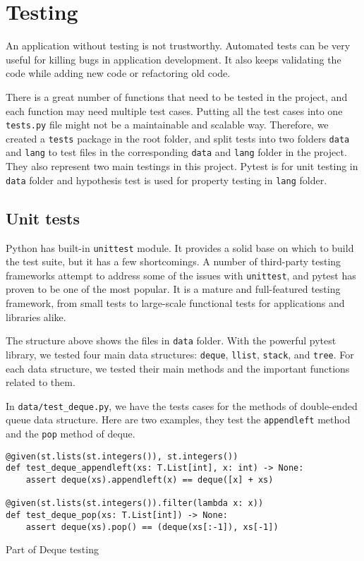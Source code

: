 \section{Testing}
\label{sec:test}
An application without testing is not trustworthy. Automated tests can be very useful for killing bugs in application development. It also keeps validating the code while adding new code or refactoring old code. 

There is a great number of functions that need to be tested in the project, and each function may need multiple test cases. Putting all the test cases into one \texttt{tests.py} file might not be a maintainable and scalable way. Therefore, we created a \texttt{tests} package in the root folder, and split tests into two folders \texttt{data} and \texttt{lang} to test files in the corresponding \texttt{data} and \texttt{lang} folder in the project. They also represent two main testings in this project. Pytest \cite{pytest} is for unit testing in \texttt{data} folder and hypothesis test \cite{hytest} is used for property testing in \texttt{lang} folder.


\subsection{Unit tests}
Python has built-in \texttt{unittest} module. It provides a solid base on which to build the test suite, but it has a few shortcomings. A number of third-party testing frameworks attempt to address some of the issues with \texttt{unittest}, and pytest \cite{pytestbook} has proven to be one of the most popular. It is a mature and full-featured testing framework, from small tests to large-scale functional tests for applications and libraries alike.


The structure above shows the files in \texttt{data} folder. With the powerful pytest library, we tested four main data structures: \texttt{deque}, \texttt{llist}, \texttt{stack}, and \texttt{tree}. For each data structure, we tested their main methods and the important functions related to them.

In \texttt{data/test\_deque.py}, we have the tests cases for the methods of double-ended queue data structure. Here are two examples, they test the \texttt{appendleft} method and the \texttt{pop} method of deque.
\begin{listing}[H]
\begin{verbatim}
@given(st.lists(st.integers()), st.integers())
def test_deque_appendleft(xs: T.List[int], x: int) -> None:
    assert deque(xs).appendleft(x) == deque([x] + xs)

@given(st.lists(st.integers()).filter(lambda x: x))
def test_deque_pop(xs: T.List[int]) -> None:
    assert deque(xs).pop() == (deque(xs[:-1]), xs[-1])
\end{verbatim}
\caption{Part of Deque testing}
\end{listing}

